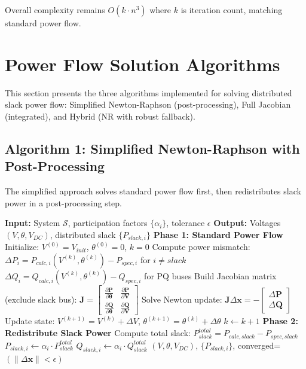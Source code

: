 \documentclass[11pt]{article}
\begin{document}
Overall complexity remains $O(k \cdot n^3)$ where $k$ is iteration count, matching standard power flow.

\section{Power Flow Solution Algorithms}

This section presents the three algorithms implemented for solving distributed slack power flow: Simplified Newton-Raphson (post-processing), Full Jacobian (integrated), and Hybrid (NR with robust fallback).

\subsection{Algorithm 1: Simplified Newton-Raphson with Post-Processing}

The simplified approach solves standard power flow first, then redistributes slack power in a post-processing step.

\begin{algorithm}
\caption{Simplified NR with Distributed Slack (Post-Processing)}
\begin{algorithmic}[1]
\STATE \textbf{Input:} System $\mathcal{S}$, participation factors $\{\alpha_i\}$, tolerance $\epsilon$
\STATE \textbf{Output:} Voltages $(V, \theta, V_{DC})$, distributed slack $\{P_{slack,i}\}$
\STATE
\STATE \textbf{Phase 1: Standard Power Flow}
\STATE Initialize: $V^{(0)} = V_{init}$, $\theta^{(0)} = 0$, $k = 0$
\REPEAT
    \STATE Compute power mismatch:
    \STATE \quad $\Delta P_i = P_{calc,i}(V^{(k)}, \theta^{(k)}) - P_{spec,i}$ for $i \neq slack$
    \STATE \quad $\Delta Q_i = Q_{calc,i}(V^{(k)}, \theta^{(k)}) - Q_{spec,i}$ for PQ buses
    \STATE
    \STATE Build Jacobian matrix (exclude slack bus):
    \STATE \quad $\mathbf{J} = \begin{bmatrix} \frac{\partial \mathbf{P}}{\partial \boldsymbol{\theta}} & \frac{\partial \mathbf{P}}{\partial \mathbf{V}} \\ \frac{\partial \mathbf{Q}}{\partial \boldsymbol{\theta}} & \frac{\partial \mathbf{Q}}{\partial \mathbf{V}} \end{bmatrix}$
    \STATE
    \STATE Solve Newton update: $\mathbf{J} \Delta \mathbf{x} = -\begin{bmatrix} \Delta \mathbf{P} \\ \Delta \mathbf{Q} \end{bmatrix}$
    \STATE
    \STATE Update state: $V^{(k+1)} = V^{(k)} + \Delta V$, $\theta^{(k+1)} = \theta^{(k)} + \Delta \theta$
    \STATE $k \gets k + 1$
\STATE
\STATE \textbf{Phase 2: Redistribute Slack Power}
\STATE Compute total slack: $P_{slack}^{total} = P_{calc,slack} - P_{spec,slack}$
    \STATE $P_{slack,i} \gets \alpha_i \cdot P_{slack}^{total}$
    \STATE $Q_{slack,i} \gets \alpha_i \cdot Q_{slack}^{total}$ 
\ENDFOR
\STATE
\RETURN $(V, \theta, V_{DC})$, $\{P_{slack,i}\}$, converged=$(\|\Delta \mathbf{x}\| < \epsilon)$
\end{algorithmic}
\end{algorithm}
\end{document}
